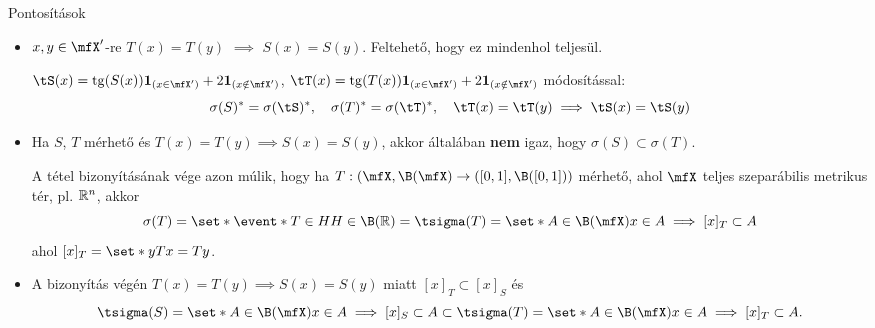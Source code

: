 \documentclass[aspectratio=169,notheorems,9pt,\option]{beamer}
\begin{document}
\begin{frame}{Pontosítások}
  \begin{itemize}
    \item $x,y\in \mfX'$-re $T(x)=T(y)$ $\implies$ $S(x)=S(y)$. Feltehető, hogy ez mindenhol teljesül.
    
    $\tS(x)=\tg(S(x))\I{x\in \mfX'}+2\I{x\notin\mfX'}$, 
    $\tT(x)=\tg(T(x))\I{x\in \mfX'}+2\I{x\notin\mfX'}$ módosítással:
    \begin{displaymath}
      \sigma(S)^*=\sigma(\tS)^*,\quad \sigma(T)^*=\sigma(\tT)^*,\quad 
      \tT(x)=\tT(y) \implies\tS(x)=\tS(y)
    \end{displaymath} 
    \item  Ha $S$, $T$ mérhető és $T(x)=T(y)\implies S(x)=S(y)$, akkor általában \textbf{nem} igaz, 
    hogy $\sigma(S)\subset\sigma(T)$. 

    A tétel bizonyításának vége azon múlik, hogy ha $T:(\mfX,\B(\mfX)\to([0,1],\B([0,1]))$ mérhető, 
    ahol $\mfX$ teljes szeparábilis metrikus tér, pl. $\mathbb{R}^n$, akkor 
    \begin{displaymath}
      \sigma(T)=\set*{\event*{T\in H}}{H\in\B(\real)}=\tsigma(T)=\set*{A\in\B(\mfX)}{x\in A\implies [x]_T\subset A}
    \end{displaymath}
    ahol $[x]_T=\set*{y}{Tx=Ty}$.
    
    \item A bizonyítás végén $T(x)=T(y)\implies S(x)=S(y)$ miatt $[x]_T\subset [x]_S$ és 
    \begin{displaymath}
      \tsigma(S)=\set*{A\in\B(\mfX)}{x\in A\implies [x]_S\subset A}\subset
      \tsigma(T)=\set*{A\in\B(\mfX)}{x\in A\implies [x]_T\subset A}.
    \end{displaymath}
  \end{itemize}
\end{frame}
\end{document}
